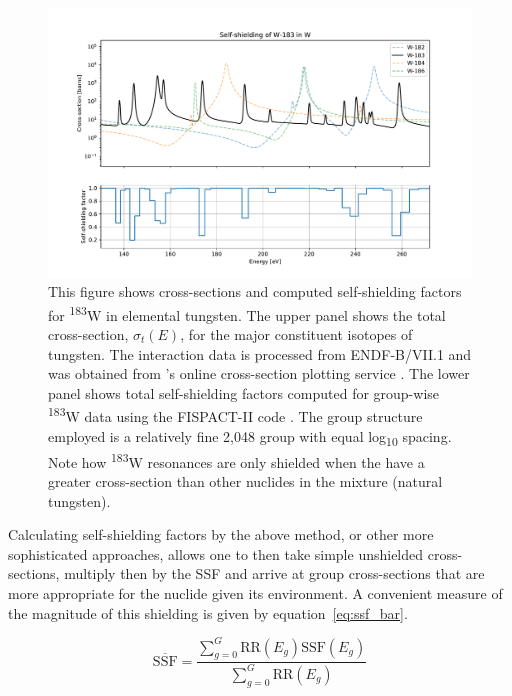 \begin{figure}[H]
  \centering
  \includegraphics[width=\linewidth]{W-183_shielding}
  \caption[Self-shielding of $^{183}$W in elemental W.]{This figure shows cross-sections and computed self-shielding factors for \textsuperscript{183}W in elemental tungsten. The upper panel shows the total cross-section, $\sigma_{t}(E)$, for the major constituent isotopes of tungsten. The interaction data is processed from ENDF-B/VII.1 and was obtained from \citeauthor{Shimwell2018}'s online cross-section plotting service \cite{Shimwell2018}. The lower panel shows total self-shielding factors computed for group-wise \textsuperscript{183}W data using the FISPACT-II code \cite{sublet2017a}. The group structure employed is a relatively fine 2,048 group with equal log\textsubscript{10} spacing. Note how \textsuperscript{183}W resonances are only shielded when the have a greater cross-section than other nuclides in the mixture (natural tungsten).}
  \label{fig:W-183_shielding}
\end{figure}

Calculating self-shielding factors by the above method, or other more sophisticated approaches, allows one to then take simple unshielded cross-sections, multiply then by the SSF and arrive at group cross-sections that are more appropriate for the nuclide given its environment. A convenient measure of the magnitude of this shielding is given by equation~\ref{eq:ssf_bar}.

\begin{equation}
  \label{eq:ssf_bar}
  \overline{\mathrm{SSF}} = \frac{\sum_{g=0}^{G}\mathrm{RR}(E_{g})\mathrm{SSF}(E_{g})}
                                          {\sum_{g=0}^{G}\mathrm{RR}(E_{g})}
\end{equation}

